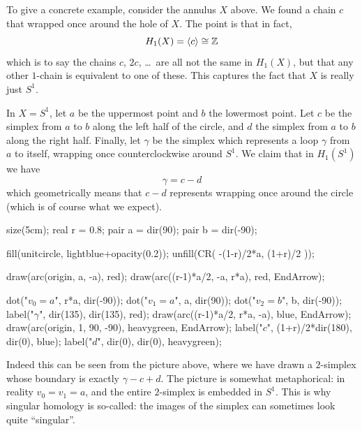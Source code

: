 \begin{example}
	To give a concrete example, consider the annulus $X$ above.
	We found a chain $c$ that wrapped once around the hole of $X$.
	The point is that in fact,
	\[ H_1(X) = \left< c\right> \cong \mathbb Z \]
	which is to say the chains $c$, $2c$, \dots\ are all not the same in $H_1(X)$,
	but that any other $1$-chain is equivalent to one of these.
	This captures the fact that $X$ is really just $S^1$.
\end{example}
\begin{example}
	\label{ex:S1_c_minus_d}
	In $X = S^1$, let $a$ be the uppermost point and $b$ the lowermost point.
	Let $c$ be the simplex from $a$ to $b$ along the left half of the circle,
	and $d$ the simplex from $a$ to $b$ along the right half.
	Finally, let $\gamma$ be the simplex which represents a loop $\gamma$ from $a$
	to itself, wrapping once counterclockwise around $S^1$.
	We claim that in $H_1(S^1)$ we have
	\[ \gamma = c - d \]
	which geometrically means that $c-d$ represents wrapping once around
	the circle (which is of course what we expect).

	\begin{center}
		\begin{asy}
			size(5cm);
			real r = 0.8;
			pair a = dir(90);
			pair b = dir(-90);

			fill(unitcircle, lightblue+opacity(0.2));
			unfill(CR( -(1-r)/2*a, (1+r)/2 ));

			draw(arc(origin, a, -a), red);
			draw(arc((r-1)*a/2, -a, r*a), red, EndArrow);

			dot("$v_0=a$", r*a, dir(-90));
			dot("$v_1=a$", a, dir(90));
			dot("$v_2=b$", b, dir(-90));
			label("$\gamma$", dir(135), dir(135), red);
			draw(arc((r-1)*a/2, r*a, -a), blue, EndArrow);
			draw(arc(origin, 1, 90, -90), heavygreen, EndArrow);
			label("$c$", (1+r)/2*dir(180), dir(0), blue);
			label("$d$", dir(0), dir(0), heavygreen);
		\end{asy}
	\end{center}

	Indeed this can be seen from the picture above, where we have drawn
	a $2$-simplex whose boundary is exactly $\gamma - c + d$.
	The picture is somewhat metaphorical: in reality $v_0 = v_1 = a$,
	and the entire $2$-simplex is embedded in $S^1$.
	This is why singular homology is so-called: the images of the simplex
	can sometimes look quite ``singular''.
\end{example}

